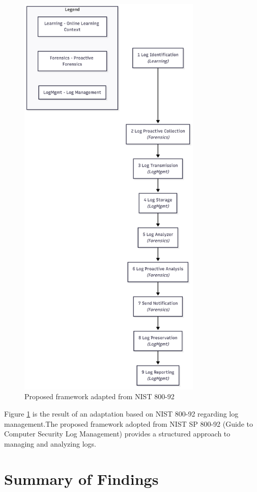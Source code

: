 \begin{figure}[H]
	\centering
	\includegraphics[height=20cm]{figure/framework-adopted-nist-800-92.png}
	\caption{Proposed framework adapted from NIST 800-92}
	\label{fig:framework-proposed}
\end{figure}


Figure \ref{fig:framework-proposed} is the result of an adaptation based on NIST 800-92 regarding log management.The proposed framework adopted from NIST SP 800-92 (Guide to Computer Security Log Management) provides a structured approach to managing and analyzing logs.



\section{Summary of Findings}

